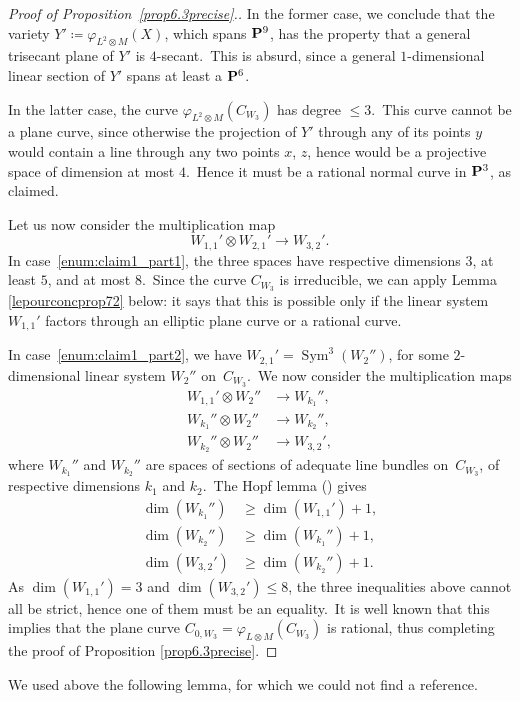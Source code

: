\documentclass[12pt]{amsart}
\def\P{{\bf P}}
\def\phi{\varphi}
\def\otp{}
\DeclareMathOperator{\Sym}{Sym}
\def\lra{\longrightarrow}
\theoremstyle{remark}
\begin{document}
\begin{proof}[Proof of Proposition~\ref{prop6.3precise}.]
In the former case, we conclude that the variety $Y'\coloneqq\phi_{L^{\otp 2}\otimes M}(X)$, which spans $\P^9$, has the property that a general trisecant plane of $Y'$ is $4$-secant.\
This is absurd, since a general $1$-dimensional linear section of $Y'$ spans at least a $\P^6$.\

In the latter case, the curve $\phi_{L^{\otp 2}\otimes M}(C_{W_3})$ has  degree $\leq 3$.\
This curve cannot be a plane curve, since otherwise the projection of $Y'$ through any of its points $y$ would contain a line through any two points $x$, $z$, hence would be a projective space of dimension at most $4$.\
Hence it must be a rational normal curve in $\P^3$, as claimed.

Let us now consider the multiplication map
\[
W_{1,1}'\otimes W_{2,1}'\lra  W_{3,2}'.
\]
In case~\ref{enum:claim1_part1}, the three spaces have respective dimensions $3$, at least $5$, and at most $8$.\
Since the curve $C_{W_3}$ is irreducible, we can apply Lemma \ref{lepourconcprop72} below: it says that   this is possible only if the linear system $W_{1,1}'$ factors through an elliptic plane  curve  or  a rational curve.

In case~\ref{enum:claim1_part2}, we have $W_{2,1}'=\Sym^3(W_2'')$, for some $2$-dimensional linear system $W_2''$ on~$C_{W_3}$.\
We now consider the multiplication maps
\begin{align*}
W_{1,1}'\otimes W_2''&\lra  W_{k_1}'',\\
W_{k_1}''\otimes W_2''&\lra  W_{k_2}'',\\
W_{k_2}''\otimes W_2''&\lra  W_{3,2}',
\end{align*}
where $W_{k_1}''$ and $W_{k_2}''$ are spaces of sections of adequate line bundles on~$C_{W_3}$, of respective dimensions $k_1$ and $k_2$.\
The Hopf lemma (\cite[p.~108]{acgh}) gives
\begin{align*}
\dim (W_{k_1}'')&\geq \dim (W_{1,1}')+1,\\
\dim (W_{k_2}'')&\geq \dim (W_{k_1}'')+1,\\
\dim (W_{3,2}')&\geq \dim (W_{k_2}'')+1.
\end{align*}
As $\dim (W_{1,1}')=3$ and $\dim (W_{3,2}')\leq 8$, the three inequalities above cannot all be strict, hence one of them must be an equality.\
It is well known that this implies  that the plane curve $C_{0,W_3}=\phi_{L\otimes M}(C_{W_3}) $ is rational, thus completing the proof of Proposition \ref{prop6.3precise}.
\end{proof}

We used  above the following lemma, for which we could not find a reference.
\end{document}

